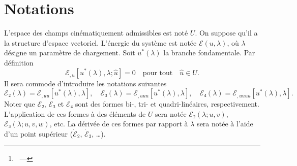 \documentclass[12pt, final]{scrartcl}
\theoremstyle{definition}
\begin{document}
\title{\sbtitle}
\author{\sbauthor\thanks{\sbaddress~--- \sbemail}}
\maketitle

\begin{abstract}
  These are my notes on the LSK method for the analysis of the stability and
  bifurcation(s) of a conservative system. These notes are based on several
  references: Koiter's initial PhD thesis~\parencite{koit1945} as well as some
  graphical illustrations from his lecture notes~\parencite{koit2009}. I enjoyed
  the concise presentation of \textcite{nguy2000} as well as the lecture notes
  of \textcite{tria2017}. Finally, the chapter by \textcite{poti1987} helped me
  clear some issues.

  These notes by Sébastien Brisard are licensed under a Creative Commons
  Attribution 4.0 International License. To view a copy of this license, visit
  \url{http://creativecommons.org/licenses/by/4.0/}.

  I hope the reader will find these notes useful, even though there are still a
  few points which I do not fully understand (they are clearly indicated in the
  text).
\end{abstract}

\section{Notations}

L'espace des champs cinématiquement admissibles est noté \(U\). On suppose qu'il
a la structure d'espace vectoriel. L'énergie du système est notée \(ℰ(u, λ)\),
où \(λ\) désigne un paramètre de chargement. Soit \(u^{\ast}(λ)\) la branche
fondamentale. Par définition
\begin{equation}
  ℰ_{,u}[u^{\ast}(λ), λ; \hat{u}]=0 \quad \text{pour tout} \quad \hat{u}∈U.
\end{equation}
Il sera commode d'introduire les notations suivantes
\begin{equation}
  ℰ₂(λ) = ℰ_{,uu}[u^{\ast}(λ), λ], \quad ℰ₃(λ) = ℰ_{,uuu}[u^{\ast}(λ), λ], \quad ℰ₄(λ) = ℰ_{,uuuu} [u^{\ast}(λ), λ].
\end{equation}
Noter que \(ℰ₂\), \(ℰ₃\) et \(ℰ₄\) sont des formes bi-, tri- et
quadri-linéaires, respectivement. L'application de ces formes à des éléments de
\(U\) sera notée \(ℰ₂(λ; u, v)\), \(ℰ₃(λ; u, v, w)\), etc. La dérivée de ces
formes par rapport à \(λ\) sera notée à l'aide d'un point supérieur
(\(\dot{ℰ}_2\), \(\dot{ℰ}_3\), \dots).
\end{document}
